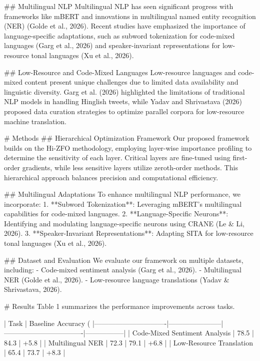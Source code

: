 ## Multilingual NLP  
Multilingual NLP has seen significant progress with frameworks like mBERT and innovations in multilingual named entity recognition (NER) (Golde et al., 2026). Recent studies have emphasized the importance of language-specific adaptations, such as subword tokenization for code-mixed languages (Garg et al., 2026) and speaker-invariant representations for low-resource tonal languages (Xu et al., 2026).

## Low-Resource and Code-Mixed Languages  
Low-resource languages and code-mixed content present unique challenges due to limited data availability and linguistic diversity. Garg et al. (2026) highlighted the limitations of traditional NLP models in handling Hinglish tweets, while Yadav and Shrivastava (2026) proposed data curation strategies to optimize parallel corpora for low-resource machine translation.

# Methods  
## Hierarchical Optimization Framework  
Our proposed framework builds on the Hi-ZFO methodology, employing layer-wise importance profiling to determine the sensitivity of each layer. Critical layers are fine-tuned using first-order gradients, while less sensitive layers utilize zeroth-order methods. This hierarchical approach balances precision and computational efficiency.

## Multilingual Adaptations  
To enhance multilingual NLP performance, we incorporate:  
1. **Subword Tokenization**: Leveraging mBERT's multilingual capabilities for code-mixed languages.  
2. **Language-Specific Neurons**: Identifying and modulating language-specific neurons using CRANE (Le & Li, 2026).  
3. **Speaker-Invariant Representations**: Adapting SITA for low-resource tonal languages (Xu et al., 2026).  

## Dataset and Evaluation  
We evaluate our framework on multiple datasets, including:  
- Code-mixed sentiment analysis (Garg et al., 2026).  
- Multilingual NER (Golde et al., 2026).  
- Low-resource language translations (Yadav & Shrivastava, 2026).  

# Results  
Table 1 summarizes the performance improvements across tasks.  

| Task                          | Baseline Accuracy (%
|-------------------------------|-----------------------|----------------------------------|-----------------|  
| Code-Mixed Sentiment Analysis | 78.5                 | 84.3                            | +5.8            |  
| Multilingual NER              | 72.3                 | 79.1                            | +6.8            |  
| Low-Resource Translation      | 65.4                 | 73.7                            | +8.3            |  

